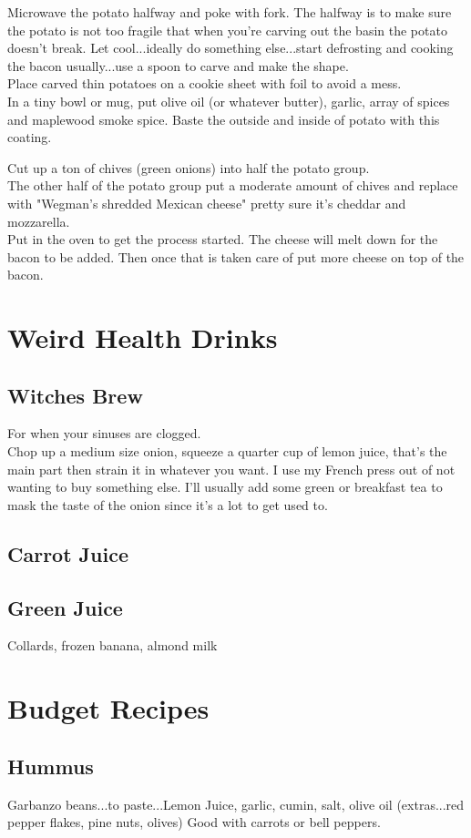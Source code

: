 \documentclass{article}
\begin{document}
Microwave the potato halfway and poke with fork. The halfway is to make sure the potato is not too fragile that when you're carving out the basin the potato doesn't break. Let cool...ideally do something else...start defrosting and cooking the bacon usually...use a spoon to carve and make the shape. \\ 
Place carved thin potatoes on a cookie sheet with foil to avoid a mess. \\
In a tiny bowl or mug, put olive oil (or whatever butter), garlic, array of spices and maplewood smoke spice. Baste the outside and inside of potato with this coating. 

Cut up a ton of chives (green onions) into half the potato group. \\ 
The other half of the potato group put a moderate amount of chives and replace with "Wegman's shredded Mexican cheese" pretty sure it's cheddar and mozzarella. \\ 
Put in the oven to get the process started. The cheese will melt down for the bacon to be added. Then once that is taken care of put more cheese on top of the bacon. \\ 



\section*{Weird Health Drinks}

\subsection*{Witches Brew} 
For when your sinuses are clogged. \\ 
Chop up a medium size onion, squeeze a quarter cup of lemon juice, that's the main part then strain it in whatever you want. I use my French press out of not wanting to buy something else. I'll usually add some green or breakfast tea to mask the taste of the onion since it's a lot to get used to. 

\subsection*{Carrot Juice} 

\subsection*{Green Juice}
Collards, frozen banana, almond milk 

\section*{Budget Recipes}

\subsection*{Hummus}
Garbanzo beans...to paste...Lemon Juice, garlic, cumin, salt, olive oil (extras...red pepper flakes, pine nuts, olives)
Good with carrots or bell peppers.
\end{document}
